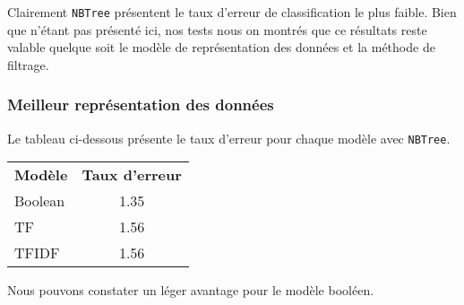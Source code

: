 Clairement \texttt{NBTree} présentent le taux d'erreur de classification le plus faible. Bien que n'étant pas présenté ici, nos tests nous on montrés que ce résultats reste valable quelque soit le modèle de représentation des données  et la méthode de filtrage.

\subsubsection{Meilleur représentation des données}

Le tableau ci-dessous présente le taux d'erreur pour chaque modèle avec \texttt{NBTree}.

\begin{tabular}{l c} 
\textbf{Modèle} & \textbf{Taux d'erreur}\\
Boolean & 1.35\\
TF & 1.56\\
TFIDF & 1.56\\
\end{tabular}

Nous pouvons constater un léger avantage pour le modèle booléen. 





